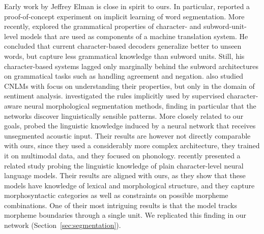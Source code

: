 Early work by Jeffrey Elman is close in spirit to ours. In particular,
 reported a proof-of-concept experiment on
implicit learning of word segmentation. More recently,
 explored the grammatical properties of
character- and subword-unit-level models that are used as components
of a machine translation system. He concluded that current
character-based decoders generalize better to unseen words, but
capture less grammatical knowledge than subword units. Still, his
character-based systems lagged only marginally behind the subword
architectures on grammatical tasks such as handling agreement and
negation.  also studied CNLMs
with focus on understanding their properties, but only in the domain
of sentiment analysis.  investigated the
rules implicitly used by supervised character-aware neural
morphological segmentation methods, finding in particular that the
networks discover linguistically sensible patterns. More closely
related to our goals,  probed the
linguistic knowledge induced by a neural network that receives
unsegmented acoustic input. Their results are however not directly
comparable with ours, since they used a considerably more complex
architecture, they trained it on multimodal data, and they focused on
phonology.  recently presented a
related study probing the linguistic knowledge of plain
character-level neural language models. Their results are aligned with
ours, as they show that these models have knowledge of lexical and
morphological structure, and they capture morphosyntactic categories
as well as constraints on possible morpheme combinations. One of their
most intriguing results is that the model tracks morpheme boundaries
through a single unit.
We replicated this finding in our network (Section~\ref{sec:segmentation}).


